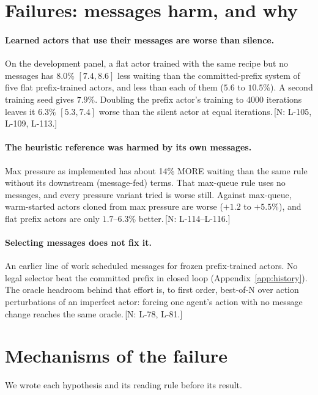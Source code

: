\documentclass[11pt]{article}
\theoremstyle{definition}
\newif\ifshownotes\shownotestrue
\newcommand{\NOTE}[1]{\ifshownotes{\color{notecol}\,\textsf{\footnotesize[N: #1]}}\fi}
\begin{document}
\section{Failures: messages harm, and why}\label{sec:fail}
\paragraph{Learned actors that use their messages are worse than silence.} On the development panel, a flat actor
trained with the same recipe but no messages has $8.0\%$ $[7.4,8.6]$ less waiting than the committed-prefix system of
five flat prefix-trained actors, and less than each of them ($5.6$ to $10.5\%$). A second training seed gives $7.9\%$.
Doubling the prefix actor's training to 4000 iterations leaves it $6.3\%$ $[5.3,7.4]$ worse than the silent actor at
equal iterations.\NOTE{L-105, L-109, L-113.}
\paragraph{The heuristic reference was harmed by its own messages.} Max pressure as implemented has about 14\% MORE
waiting than the same rule without its downstream (message-fed) terms. That max-queue rule uses no messages, and every
pressure variant tried is worse still. Against max-queue, warm-started actors cloned from max pressure are worse
($+1.2$ to $+5.5\%$), and flat prefix actors are only $1.7$--$6.3\%$ better.\NOTE{L-114--L-116.}
\paragraph{Selecting messages does not fix it.} An earlier line of work scheduled messages for frozen prefix-trained
actors. No legal selector beat the committed prefix in closed loop (Appendix~\ref{app:history}). The oracle headroom
behind that effort is, to first order, best-of-N over action perturbations of an imperfect actor: forcing one agent's
action with no message change reaches the same oracle.\NOTE{L-78, L-81.}

\section{Mechanisms of the failure}\label{sec:mech}
We wrote each hypothesis and its reading rule before its result.
\end{document}
